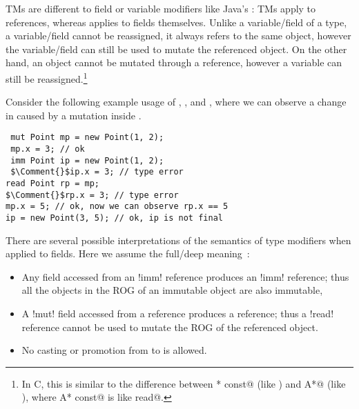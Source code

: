 \noindent TMs are different to field or variable modifiers like Java's \Q@final@: TMs apply to references, whereas \Q@final@ applies to fields themselves. Unlike a variable/field of a \Q@read@ type, a \Q@final@ variable/field cannot be reassigned, it always refers to the same object, however the variable/field can still be used to mutate the referenced object.
On the other hand, an object cannot be mutated through a \Q@read@ reference, however a \Q@read@ variable can still be reassigned.\footnote{In C, this is similar to the difference between \Q@A* const@ (like \Q@final@) and \Q@const A*@ (like \Q@read@), where \Q@const A* const@ is like \Q@final read@.}

Consider the following  example usage of \Q@mut@, \Q@imm@, and \Q@read@, where we can observe a change in \Q@rp@ caused by a mutation inside \Q@mp@.
\begin{lstlisting}
 mut Point mp = new Point(1, 2);
 mp.x = 3; // ok
 imm Point ip = new Point(1, 2);
 $\Comment{}$ip.x = 3; // type error
read Point rp = mp;
$\Comment{}$rp.x = 3; // type error
mp.x = 5; // ok, now we can observe rp.x == 5
ip = new Point(3, 5); // ok, ip is not final
\end{lstlisting} 

There are several possible interpretations of the semantics of type modifiers when applied to fields.
Here we assume the full/deep meaning~\cite{ZibinEtAl10,Potanin2013}:
\SSI\begin{itemize}
  \item Any field accessed from an \Q!imm! reference produces an \Q!imm! reference; thus all the objects in the ROG of an immutable object are also immutable,
  \item A \Q!mut! field accessed from a \Q@read@ reference produces a \Q@read@ reference; thus a \Q!read! reference cannot be used to mutate the ROG of the referenced object.
  \item No casting or promotion from \Q@read@ to \Q@mut@ is allowed.
\end{itemize}

